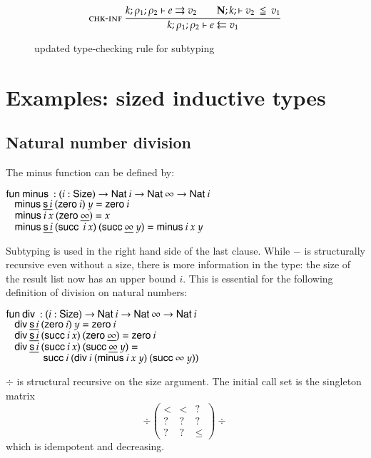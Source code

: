 \begin{figure}[htp]

\begin{gather*}
\mbox{\sc chk-inf}\ \dfrac{k;\rho_1;\rho_2\vdash e\rightrightarrows v_2
\qquad
{\mathbf{N};k;\vdash v_2\:\leqq\:v_1}}{k;\rho_1;\rho_2\vdash e\leftleftarrows v_1}
\end{gather*}
\caption{updated type-checking rule for subtyping}
\label{fnews}
\end{figure}

\section{Examples: sized inductive types }

\subsection{Natural number division}

The minus function can be defined by:
\begin{bsp}
$\mathsf{fun}\: \mathsf{minus}\: : (i : \mathsf{Size} ) \rightarrow \mathsf{Nat}\: i \rightarrow \mathsf{Nat}\: \infty \rightarrow \mathsf{Nat}\: i$\\
$\hspace*{3mm} \mathsf{minus}\: \underline{\mathsf{s}\, i} \: (\mathsf{zero}\: i) \:  y = \mathsf{zero}\: i $ \\
$\hspace*{3mm} \mathsf{minus}\: i \: x \: (\mathsf{zero}\: \underline{\infty})  = x $\\
$\hspace*{3mm} \mathsf{minus}\: \underline{\mathsf{s}\, i} \: (\mathsf{succ}\: \: i \: x) \: (\mathsf{succ}\: \underline{\infty} \: y) = \mathsf{minus}\: i \: x \: y $
\end{bsp}
Subtyping is used in the right hand side of the last clause.
While $\minus$ is structurally recursive even without a size, 
there is more information in the type: the size of the result list now has an upper bound $i$.
This is essential for the following definition of division on natural numbers:
\begin{bsp}
$\mathsf{fun}\: \mathsf{div}\: : ( i : \mathsf{Size} )  \rightarrow  \mathsf{Nat}\: i \rightarrow \mathsf{Nat}\: \infty \rightarrow \mathsf{Nat}\: i$\\
$\hspace*{3mm} \mathsf{div}\: \underline{\mathsf{s}\, i} \: (\mathsf{zero}\: i) \: y = \mathsf{zero}\: i$\\
$\hspace*{3mm} \mathsf{div}\: \underline{\mathsf{s}\, i} \: (\mathsf{succ}\: i \: x) \: (\mathsf{zero}\: \underline{\infty})  = \mathsf{zero}\: i$\\
$\hspace*{3mm} \mathsf{div}\: \underline{\mathsf{s}\, i} \: (\mathsf{succ}\: i \: x) \: (\mathsf{succ}\: \underline{\infty} \: y) = $\\
$\spc \spcx \suc i \: (\div i \: (\minus i \: x \:y) \: (\suc \infty \: y))$
\end{bsp}
$\div$ is structural recursive on the size argument.
The initial call set is the singleton matrix
\[
\div
\begin{pmatrix}
<    &  <  & ? \\
?    &  ?  &  ? \\
?    &  ?  & \leq 
\end{pmatrix}\div
\] 
which is idempotent and decreasing.

